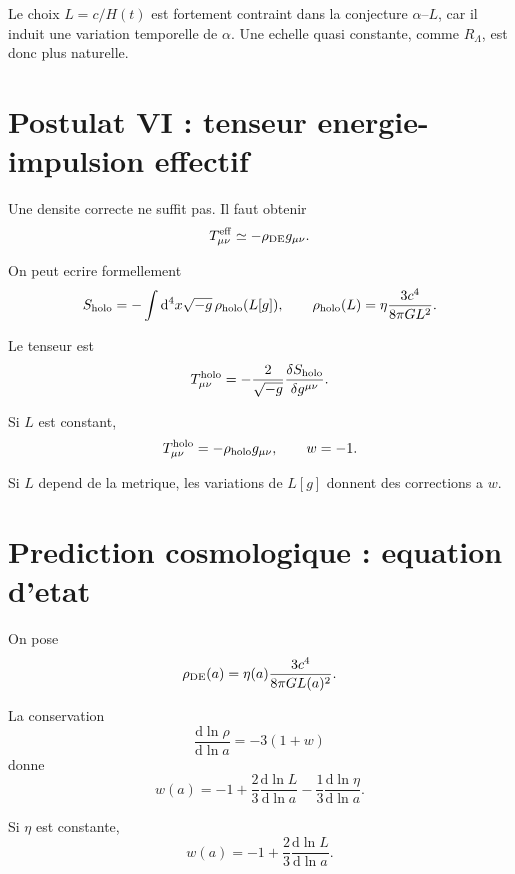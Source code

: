 \documentclass[11pt,a4paper]{article}
\newcommand{\dif}{\mathrm d}
\begin{document}
Le choix \(L=c/H(t)\) est fortement contraint dans la conjecture
\(\alpha\)--\(L\), car il induit une variation temporelle de \(\alpha\). Une
echelle quasi constante, comme \(R_\Lambda\), est donc plus naturelle.

\section{Postulat VI : tenseur energie-impulsion effectif}

Une densite correcte ne suffit pas. Il faut obtenir
\begin{equation}
T_{\mu\nu}^{\rm eff}\simeq -\rho_{\rm DE}g_{\mu\nu}.
\end{equation}

On peut ecrire formellement
\begin{equation}
S_{\rm holo}=-\int \dif^4x\sqrt{-g}\,\rho_{\rm holo}(L[g]),
\qquad
\rho_{\rm holo}(L)=\eta\frac{3c^4}{8\pi GL^2}.
\end{equation}

Le tenseur est
\begin{equation}
T_{\mu\nu}^{\rm holo}
=-\frac{2}{\sqrt{-g}}\frac{\delta S_{\rm holo}}{\delta g^{\mu\nu}}.
\end{equation}

Si \(L\) est constant,
\begin{equation}
T_{\mu\nu}^{\rm holo}=-\rho_{\rm holo}g_{\mu\nu},
\qquad
w=-1.
\end{equation}

Si \(L\) depend de la metrique, les variations de \(L[g]\) donnent des
corrections a \(w\).

\section{Prediction cosmologique : equation d'etat}

On pose
\begin{equation}
\rho_{\rm DE}(a)=\eta(a)\frac{3c^4}{8\pi G L(a)^2}.
\end{equation}

La conservation
\begin{equation}
\frac{\dif\ln\rho}{\dif\ln a}=-3(1+w)
\end{equation}
donne
\begin{equation}
\boxed{
w(a)= -1+\frac{2}{3}\frac{\dif\ln L}{\dif\ln a}
       -\frac{1}{3}\frac{\dif\ln\eta}{\dif\ln a}.
}
\end{equation}

Si \(\eta\) est constante,
\begin{equation}
\boxed{
w(a)= -1+\frac{2}{3}\frac{\dif\ln L}{\dif\ln a}.
}
\end{equation}
\end{document}
